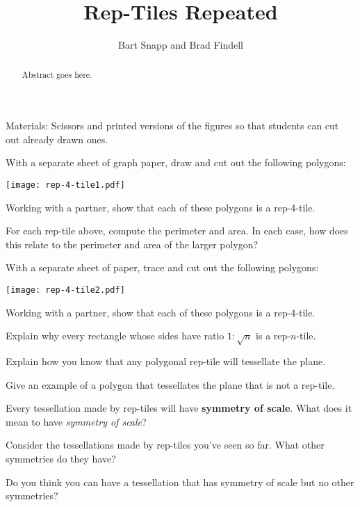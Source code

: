 \documentclass{ximera}
\title{Rep-Tiles Repeated}
\author{Bart Snapp and Brad Findell}
\begin{document}
\begin{abstract}
Abstract goes here.  
\end{abstract}
\maketitle


\begin{teachingnote}
Materials:  Scissors and printed versions of the figures so that students can cut out already drawn ones.   
\end{teachingnote}

\begin{problem}
With a separate sheet of graph paper, draw and cut out the following polygons:
\begin{image}
\texttt{[image: rep-4-tile1.pdf]}
\end{image}
Working with a partner, show that each of these polygons is a rep-4-tile.
\end{problem}

\begin{problem}
For each rep-tile above, compute the perimeter and area. In each case,
how does this relate to the perimeter and area of the larger polygon?
\end{problem}


\begin{problem}
With a separate sheet of paper, trace and cut out the following
polygons:
\begin{image}
\texttt{[image: rep-4-tile2.pdf]}
\end{image}
Working with a partner, show that each of these polygons is a rep-4-tile.
\end{problem}


\begin{problem}
Explain why every rectangle whose sides have ratio $1:\sqrt{n}$ is a
rep-$n$-tile.
\end{problem}

\begin{problem}
Explain how you know that any polygonal rep-tile will tessellate the plane.
\end{problem}

\begin{problem}
Give an example of a polygon that tessellates the plane that is not a
rep-tile.
\end{problem}


\begin{problem}
Every tessellation made by rep-tiles will have \textbf{symmetry of scale}. What does it mean to have \textit{symmetry of scale}?
\end{problem}

\begin{problem}
Consider the tessellations made by rep-tiles you've seen so far. What
other symmetries do they have?
\end{problem}

\begin{problem}
Do you think you can have a tessellation that has symmetry of scale
but no other symmetries?
\end{problem}
\end{document}
